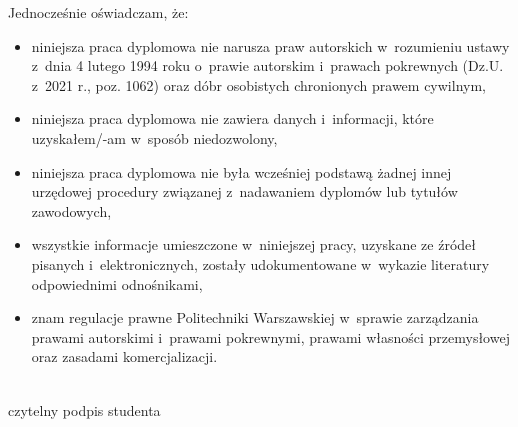 \documentclass[10pt,twoside,a4paper]{article}
\begin{document}
		Jednocześnie oświadczam, że: 
		\begin{itemize}[label=---] \setlength\itemsep{0.1em}
			\item 
			niniejsza praca dyplomowa nie narusza praw autorskich w~rozumieniu ustawy z~dnia 4 lutego 1994 roku o~prawie autorskim i~prawach pokrewnych (Dz.U. z~2021 r., poz. 1062) oraz dóbr osobistych chronionych prawem cywilnym,
			\item 
			niniejsza praca dyplomowa nie zawiera danych i~informacji, które uzyskałem/-am  	w~sposób niedozwolony, 
			\item 
			niniejsza praca dyplomowa nie była wcześniej podstawą żadnej innej urzędowej procedury związanej z~nadawaniem dyplomów lub tytułów zawodowych, 
			\item 
			wszystkie informacje umieszczone w~niniejszej pracy, uzyskane ze źródeł pisanych  i~elektronicznych, zostały udokumentowane w~wykazie literatury odpowiednimi odnośnikami, 
			\item 
			znam regulacje prawne Politechniki Warszawskiej w~sprawie zarządzania prawami autorskimi  i~prawami pokrewnymi, prawami własności przemysłowej oraz zasadami komercjalizacji.  
		\end{itemize}
	\vspace{30pt}
	\begin{flushright}
		\begin{minipage}{0.33\linewidth}
			\begin{center}
				\dotfill  \\ \vspace{-5pt}
				czytelny podpis studenta
			\end{center}
		\end{minipage}
		\begin{minipage}{0.025\linewidth}
			$\phantom{0}$
		\end{minipage}
	\end{flushright}
		
\end{document}
